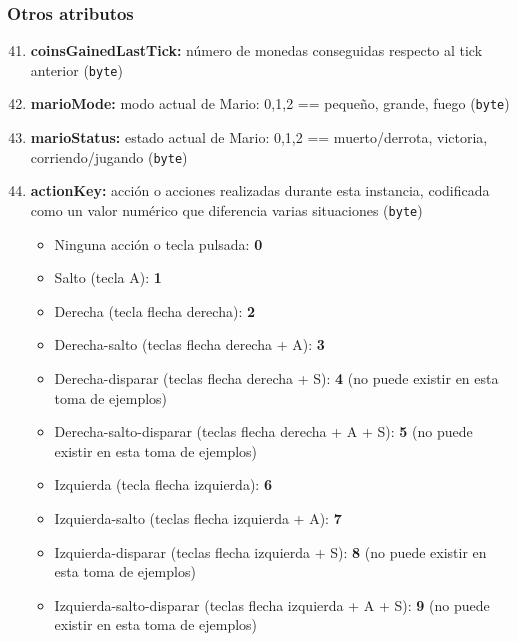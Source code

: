 \documentclass[10pt, spanish, pdftex]{../.template/template}
\begin{document}
    \subsubsection{Otros atributos}
    \begin{enumerate}
        \setcounter{enumi}{40}
        \item \textbf{coinsGainedLastTick:} número de monedas conseguidas respecto al tick anterior (\texttt{byte})
        \item \textbf{marioMode:} modo actual de Mario: 0,1,2 == pequeño, grande, fuego (\texttt{byte})
        \item \textbf{marioStatus:} estado actual de Mario: 0,1,2 == muerto/derrota, victoria, corriendo/jugando (\texttt{byte})
        \item \textbf{actionKey:} acción o acciones realizadas durante esta instancia, codificada como un valor numérico que diferencia varias situaciones (\texttt{byte})
        \begin{itemize}
            \item Ninguna acción o tecla pulsada: \textbf{0}
            \item Salto (tecla A): \textbf{1}
            \item Derecha (tecla flecha derecha): \textbf{2}
            \item Derecha-salto (teclas flecha derecha + A): \textbf{3}
            \item Derecha-disparar (teclas flecha derecha + S): \textbf{4} (no puede existir en esta toma de ejemplos)
            \item Derecha-salto-disparar (teclas flecha derecha + A + S): \textbf{5} (no puede existir en esta toma de ejemplos)
            \item Izquierda (tecla flecha izquierda): \textbf{6}
            \item Izquierda-salto (teclas flecha izquierda + A): \textbf{7}
            \item Izquierda-disparar (teclas flecha izquierda + S): \textbf{8} (no puede existir en esta toma de ejemplos)
            \item Izquierda-salto-disparar (teclas flecha izquierda + A + S): \textbf{9} (no puede existir en esta toma de ejemplos)
        \end{itemize}
    \end{enumerate}
\end{document}
